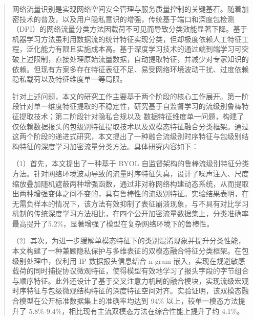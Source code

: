 

\begin{abstract}
  网络流量识别是实现网络空间安全管理与服务质量控制的关键基石。随着加密技术的普及，以及用户隐私意识的增强，传统基于端口和深度包检测（DPI）的网络流量分类方法因载荷不可见而导致分类效能显著下降。基于机器学习方法虽利用数据流的统计特征实现分类，但却极度依赖人工特征工程，泛化能力有限且实施成本高。基于深度学习技术的通过端到端学习可突破上述限制，直接处理原始流量数据，自动提取特征，并减少对专家知识的依赖。但现有方案多存在特征表征不足、易受网络环境波动干扰、过度依赖隐私载荷以及特征维度单一等局限。
  
  针对上述问题，本文的研究工作主要基于两个阶段的核心工作展开。第一阶段针对单一维度特征提取的不稳定性，研究基于自监督学习的流级别鲁棒特征提取技术；第二阶段针对隐私合规以及
  数据特征维度单一问题，构建了仅依赖数据报头的包级别特征提取技术以及双模态特征融合分类框架。通过这两个阶段的递进式研究，本文提出了一种融合流级别时序特征与包级别结构特征的深度学习加密流量分类方法。具体研究内容如下：

  （1）首先，本文提出了一种基于 BYOL 自监督架构的鲁棒流级别特征分类方法。针对网络环境波动导致的流量时序特征失真，设计了噪声注入、尺度缩放叠加随机遮蔽两种增强函数，通过非对称网络构建动态系统，从而提取出两种增强变体之间不变的，具有鲁棒性的流级别特征。实验结果表明，在无需负样本的情况下，该方法有效抑制了表征崩溃现象，与不具有对比学习机制的传统深度学习方法相比，在四个公开加密流量数据集上，分类准确率最高提升了5.2\%，显著增强了模型在复杂网络环境下的鲁棒性。

  （2）其次，为进一步缓解单模态特征下的类别混淆现象并提升分类性能，本文构建了一种兼顾隐私保护与多维表征的双模态融合特征分类框架。在包级别处理中，仅利用 IP 数据报头信息结合 n-gram 嵌入，实现在规避敏感载荷的同时捕捉协议微观特征，使得模型有效地学习了报头字段的字节组合与顺序特征。此外还设计了基于交叉注意力机制的融合模块，实现流级宏观时序特征与包级微观结构特征的深度特征空间对齐。实验证明，该双模态融合模型在公开标准数据集上的准确率均达到 94\% 以上，较单一模态方法提升了 5.8\%-9.4\%，相比现有主流双模态方法在综合性能上提升了约 4.1\%。  

\end{abstract}

